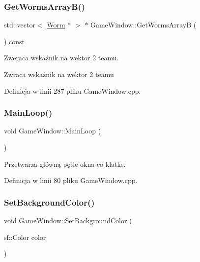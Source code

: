 \subsubsection{\texorpdfstring{Get\+Worms\+Array\+B()}{GetWormsArrayB()}}
{\footnotesize\ttfamily std\+::vector$<$ \mbox{\hyperlink{class_worm}{Worm}} $\ast$ $>$ $\ast$ Game\+Window\+::\+Get\+Worms\+ArrayB (\begin{DoxyParamCaption}{ }\end{DoxyParamCaption}) const}



Zweraca wskaźnik na wektor 2 team\textquotesingle{}u. 

\begin{DoxyReturn}{Zwraca}
wskaźnik na wektor 2 team\textquotesingle{}u 
\end{DoxyReturn}


Definicja w linii 287 pliku Game\+Window.\+cpp.

\mbox{\label{class_game_window_a7dcdd3731da278a522c59a72ecee77b3}} 
\subsubsection{\texorpdfstring{Main\+Loop()}{MainLoop()}}
{\footnotesize\ttfamily void Game\+Window\+::\+Main\+Loop (\begin{DoxyParamCaption}{ }\end{DoxyParamCaption})}



Przetwarza główną pętle okna co klatke. 



Definicja w linii 80 pliku Game\+Window.\+cpp.

\mbox{\label{class_game_window_a856649fd2f3954b6ae3c6cf9da6b17a6}} 
\subsubsection{\texorpdfstring{Set\+Background\+Color()}{SetBackgroundColor()}}
{\footnotesize\ttfamily void Game\+Window\+::\+Set\+Background\+Color (\begin{DoxyParamCaption}\item[{sf\+::\+Color}]{color }\end{DoxyParamCaption})}



